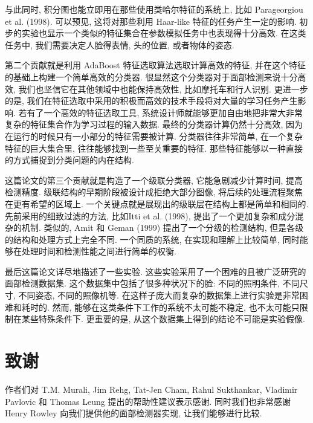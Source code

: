 \documentclass[a4paper,utf8,11pt, onecolumn]{ctexart}
\begin{document}
与此同时, 积分图也能立即用在那些使用类哈尔特征的系统上, 比如 Parageorgiou et al. (1998). 可以预见, 这将对那些利用 Haar-like 特征的任务产生一定的影响. 初步的实验也显示一个类似的特征集合在参数模拟任务中也表现得十分高效. 在这类任务中, 我们需要决定人脸得表情, 头的位置, 或者物体的姿态.

第二个贡献就是利用 AdaBoost 特征选取算法选取计算高效的特征, 并在这个特征的基础上构建一个简单高效的分类器. 很显然这个分类器对于面部检测来说十分高效, 我们也坚信它在其他领域中也能保持高效性, 比如摩托车和行人识别. 更进一步的是, 我们在特征选取中采用的积极而高效的技术手段将对大量的学习任务产生影响. 若有了一个高效的特征选取工具, 系统设计师就能够更加自由地把非常大非常复杂的特征集合作为学习过程的输入数据.
最终的分类器计算仍然十分高效, 因为在运行的时候只有一小部分的特征需要被计算. 分类器往往非常简单, 在一个复杂特征的巨大集合里, 往往能够找到一些至关重要的特征. 那些特征能够以一种直接的方式捕捉到分类问题的内在结构.

这篇论文的第三个贡献就是构造了一个级联分类器, 它能急剧减少计算时间, 提高检测精度. 级联结构的早期阶段被设计成拒绝大部分图像, 将后续的处理流程聚焦在更有希望的区域上. 一个关键点就是展现出的级联层在结构上都是简单和相同的.
先前采用的细致过滤的方法, 比如Itti et al. (1998), 提出了一个更加复杂和成分混杂的机制. 类似的, Amit 和 Geman (1999) 提出了一个分级的检测结构, 但是各级的结构和处理方式上完全不同. 一个同质的系统, 在实现和理解上比较简单, 同时能够在处理时间和检测性能之间进行简单的权衡.

最后这篇论文详尽地描述了一些实验. 这些实验采用了一个困难的且被广泛研究的面部检测数据集. 这个数据集中包括了很多种状况下的脸: 不同的照明条件, 不同尺寸, 不同姿态, 不同的照像机等. 在这样子庞大而复杂的数据集上进行实验是非常困难和耗时的. 然而, 能够在这类条件下工作的系统不太可能不稳定, 也不太可能只限制在某些特殊条件下. 更重要的是, 从这个数据集上得到的结论不可能是实验假像.
\section{致谢}
作者们对 T.M. Murali, Jim Rehg, Tat-Jen Cham, Rahul Sukthankar, Vladimir Pavlovic 和 Thomas Leung 提出的帮助性建议表示感谢. 同时我们也非常感谢 Henry Rowley 向我们提供他的面部检测器实现, 让我们能够进行比较.
\end{document}
